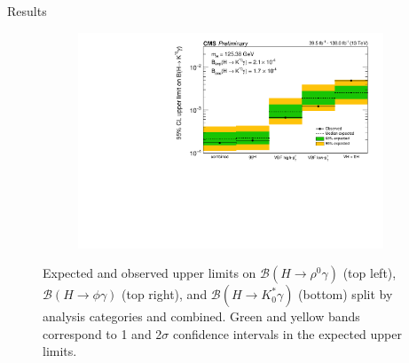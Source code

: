 \documentclass[9pt,aspectratio=1610]{beamer}
\begin{document}
\begin{frame}{Results}
\begin{figure}
\begin{subfigure}{.36\textwidth}
			\includegraphics[width=\textwidth]{figures/limitK0_final_feb29.pdf}
		\end{subfigure}
		\vspace{-1em}
		\caption{Expected and observed upper limits on $\mathcal{B}(H\rightarrow\rho^0\gamma)$ (top left), $\mathcal{B}(H\rightarrow\phi\gamma)$ (top right), and $\mathcal{B}(H\rightarrow K^*_0\gamma)$ (bottom) split by analysis categories and combined. Green and yellow bands correspond to 1 and 2$\sigma$ confidence intervals in the expected upper limits.}
	\end{figure}
\end{frame}
\end{document}
